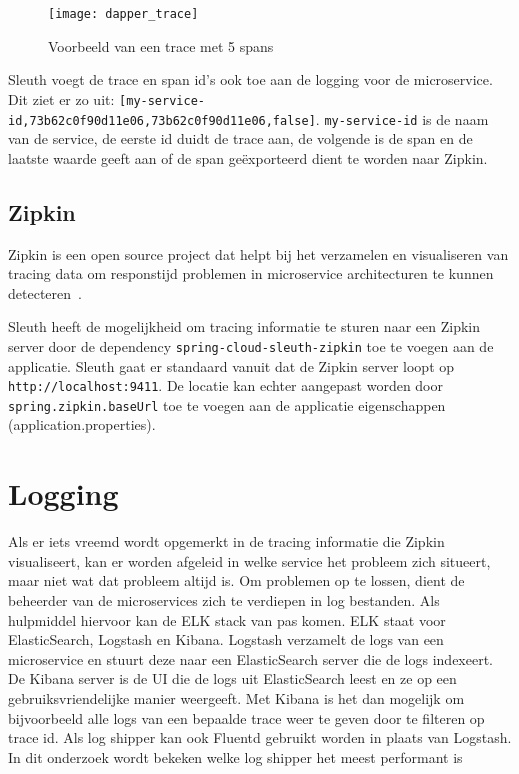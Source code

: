 \begin{figure}
\caption{Voorbeeld van een trace met 5 spans}
\centering
\texttt{[image: dapper\_trace]}
\label{fig:dapper_trace}
\end{figure}

Sleuth voegt de trace en span id's ook toe aan de logging voor de microservice. Dit ziet er zo uit: \texttt{[my-service-id,73b62c0f90d11e06,73b62c0f90d11e06,false]}. \texttt{my-service-id} is de naam van de service, de eerste id duidt de trace aan, de volgende is de span en de laatste waarde geeft aan of de span geëxporteerd dient te worden naar Zipkin.

\subsection{Zipkin}
\label{sec:zipkin}

Zipkin is een open source project dat helpt bij het verzamelen en visualiseren van tracing data om responstijd problemen in microservice architecturen te kunnen detecteren~\autocite{Zipkin2016}.

Sleuth heeft de mogelijkheid om tracing informatie te sturen naar een Zipkin server door de dependency \texttt{spring-cloud-sleuth-zipkin} toe te voegen aan de applicatie. Sleuth gaat er standaard vanuit dat de Zipkin server loopt op \texttt{http://localhost:9411}. De locatie kan echter aangepast worden door \texttt{spring.zipkin.baseUrl} toe te voegen aan de applicatie eigenschappen (application.properties).

\section{Logging}
\label{sec:logging}

Als er iets vreemd wordt opgemerkt in de tracing informatie die Zipkin visualiseert, kan er worden afgeleid in welke service het probleem zich situeert, maar niet wat dat probleem altijd is. Om problemen op te lossen, dient de beheerder van de microservices zich te verdiepen in log bestanden. Als hulpmiddel hiervoor kan de ELK stack van pas komen. ELK staat voor ElasticSearch, Logstash en Kibana. Logstash verzamelt de logs van een microservice en stuurt deze naar een ElasticSearch server die de logs indexeert. De Kibana server is de UI die de logs uit ElasticSearch leest en ze op een gebruiksvriendelijke manier weergeeft. Met Kibana is het dan mogelijk om bijvoorbeeld alle logs van een bepaalde trace weer te geven door te filteren op trace id. Als log shipper kan ook Fluentd gebruikt worden in plaats van Logstash. In dit onderzoek wordt bekeken welke log shipper het meest performant is